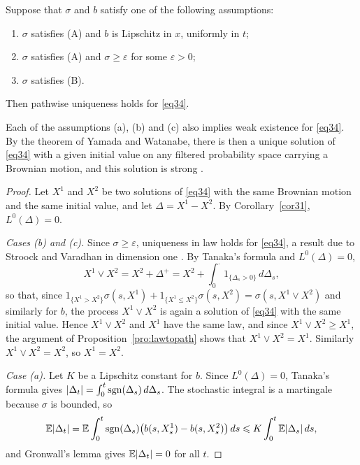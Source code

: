 \begin{theorem}\label{th31}
	Suppose that $\sigma$ and $b$ satisfy one of the following assumptions:
	\begin{enumerate}[label=(\alph*)]
		\item $\sigma$ satisfies (A) and $b$ is Lipschitz in $x$, uniformly in $t$;
		\item $\sigma$ satisfies (A) and $\sigma \geqslant \varepsilon$ for some $\varepsilon > 0$;
		\item $\sigma$ satisfies (B).
	\end{enumerate}
	Then pathwise uniqueness holds for \eqref{eq34}.
\end{theorem}

\begin{remark}
	Each of the assumptions (a), (b) and (c) also implies weak existence for
	\eqref{eq34}. By the theorem of Yamada and Watanabe, there is then a unique
	solution of \eqref{eq34} with a given initial value on any filtered probability
	space carrying a Brownian motion, and this solution is strong
	\citep{LeGall1984,RevuzYor1999}.
\end{remark}

\begin{proof}
	Let $X^1$ and $X^2$ be two solutions of \eqref{eq34} with the same Brownian
	motion and the same initial value, and let $\Delta = X^1 - X^2$. By
	Corollary~\ref{cor31}, $L^0(\Delta) = 0$.

	\emph{Cases (b) and (c).} Since $\sigma \geqslant \varepsilon$, uniqueness in law
	holds for \eqref{eq34}, a result due to Stroock and Varadhan in dimension one
	\citep{LeGall1984}. By Tanaka's formula and $L^0(\Delta) = 0$,
	\[
		X^1 \vee X^2 = X^2 + \Delta^+ = X^2 + \int_0^\cdot 1_{\{\Delta_s>0\}}\,d\Delta_s ,
	\]
	so that, since $1_{\{X^1>X^2\}}\sigma(s,X^1) + 1_{\{X^1\leqslant X^2\}}\sigma(s,X^2) = \sigma(s,X^1\vee X^2)$
	and similarly for $b$, the process $X^1\vee X^2$ is again a solution of
	\eqref{eq34} with the same initial value. Hence $X^1\vee X^2$ and $X^1$ have the
	same law, and since $X^1\vee X^2 \geqslant X^1$, the argument of
	Proposition~\ref{pro:lawtopath} shows that $X^1\vee X^2 = X^1$. Similarly
	$X^1 \vee X^2 = X^2$, so $X^1 = X^2$.

	\emph{Case (a).} Let $K$ be a Lipschitz constant for $b$. Since $L^0(\Delta)=0$,
	Tanaka's formula gives
	$|\Delta_t| = \int_0^t \operatorname{sgn}(\Delta_s)\,d\Delta_s$. The stochastic integral is a
	martingale because $\sigma$ is bounded, so
	\[
		\mathbb{E}|\Delta_t| = \mathbb{E}\int_0^t \operatorname{sgn}(\Delta_s) \big(b (s,X_s^1)-b(s,X_s^2)\big)\, ds
		\leqslant K \int_0^t \mathbb{E}|\Delta_s|\, ds ,
	\]
	and Gronwall's lemma gives $\mathbb{E}|\Delta_t|=0$ for all $t$.
\end{proof}

